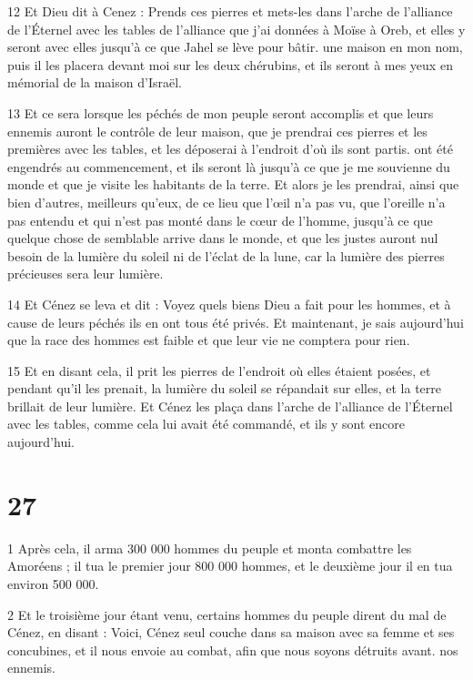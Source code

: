 \par 12 Et Dieu dit à Cenez : Prends ces pierres et mets-les dans l'arche de l'alliance de l'Éternel avec les tables de l'alliance que j'ai données à Moïse à Oreb, et elles y seront avec elles jusqu'à ce que Jahel se lève pour bâtir. une maison en mon nom, puis il les placera devant moi sur les deux chérubins, et ils seront à mes yeux en mémorial de la maison d'Israël.

\par 13 Et ce sera lorsque les péchés de mon peuple seront accomplis et que leurs ennemis auront le contrôle de leur maison, que je prendrai ces pierres et les premières avec les tables, et les déposerai à l'endroit d'où ils sont partis. ont été engendrés au commencement, et ils seront là jusqu'à ce que je me souvienne du monde et que je visite les habitants de la terre. Et alors je les prendrai, ainsi que bien d'autres, meilleurs qu'eux, de ce lieu que l'œil n'a pas vu, que l'oreille n'a pas entendu et qui n'est pas monté dans le cœur de l'homme, jusqu'à ce que quelque chose de semblable arrive dans le monde, et que les justes auront nul besoin de la lumière du soleil ni de l’éclat de la lune, car la lumière des pierres précieuses sera leur lumière.

\par 14 Et Cénez se leva et dit : Voyez quels biens Dieu a fait pour les hommes, et à cause de leurs péchés ils en ont tous été privés. Et maintenant, je sais aujourd’hui que la race des hommes est faible et que leur vie ne comptera pour rien.

\par 15 Et en disant cela, il prit les pierres de l'endroit où elles étaient posées, et pendant qu'il les prenait, la lumière du soleil se répandait sur elles, et la terre brillait de leur lumière. Et Cénez les plaça dans l'arche de l'alliance de l'Éternel avec les tables, comme cela lui avait été commandé, et ils y sont encore aujourd'hui.

\chapter{27}

\par 1 Après cela, il arma 300 000 hommes du peuple et monta combattre les Amoréens ; il tua le premier jour 800 000 hommes, et le deuxième jour il en tua environ 500 000.

\par 2 Et le troisième jour étant venu, certains hommes du peuple dirent du mal de Cénez, en disant : Voici, Cénez seul couche dans sa maison avec sa femme et ses concubines, et il nous envoie au combat, afin que nous soyons détruits avant. nos ennemis.

